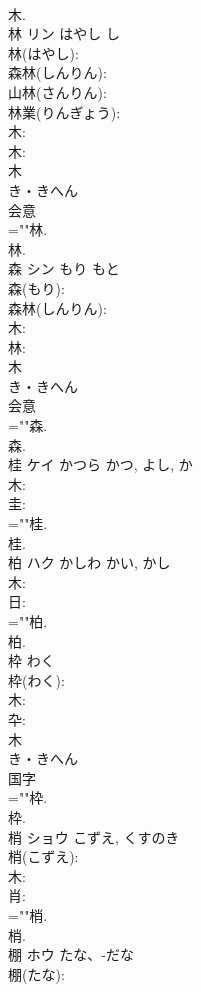 \documentclass[8pt]{extreport}
\begin{document}
\begin{CJK}{UTF8}{min}
\\	木.
\\	林	リン	はやし	し	
\\	林(はやし): 
\\	森林(しんりん): 
\\	山林(さんりん): 
\\	林業(りんぎょう): 
\\	木: 
\\	木: 
\\	木	
\\	き・きへん	
\\	会意 
\\	=""林.
\\	林.
\\	森	シン	もり	もと	
\\	森(もり): 
\\	森林(しんりん): 
\\	木: 
\\	林: 
\\	木	
\\	き・きへん	
\\	会意 
\\	=""森.
\\	森.
\\	桂	ケイ	かつら	かつ, よし, か	
\\	木: 
\\	圭: 
\\	=""桂.
\\	桂.
\\	柏	ハク	かしわ	かい, かし	
\\	木: 
\\	日: 
\\	=""柏.
\\	柏.
\\	枠		わく		
\\	枠(わく): 
\\	木: 
\\	卆: 
\\	木	
\\	き・きへん	
\\	国字 
\\	=""枠.
\\	枠.
\\	梢	ショウ	こずえ, くすのき		
\\	梢(こずえ): 
\\	木: 
\\	肖: 
\\	=""梢.
\\	梢.
\\	棚	ホウ	たな、-だな		
\\	棚(たな): 

\end{CJK}
\end{document}
